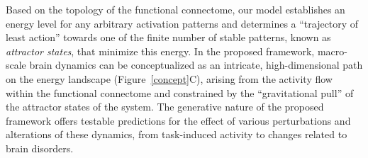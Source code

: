 \documentclass{article}
\begin{document}
Based on the topology of the functional connectome, our model establishes an energy level for any arbitrary activation patterns and determines a ``trajectory of least action'' towards one of the finite number of stable patterns, known as \textit{attractor states}, that minimize this energy. In the proposed framework, macro-scale brain dynamics can be conceptualized as an intricate, high-dimensional path on the energy landscape (Figure~\ref{concept}C), arising from the activity flow \citep{cole2016activity} within the functional connectome and constrained by the ``gravitational pull'' of the attractor states of the system.
The generative nature of the proposed framework offers testable predictions for the effect of various perturbations and alterations of these dynamics, from task-induced activity to changes related to brain disorders.
\end{document}
